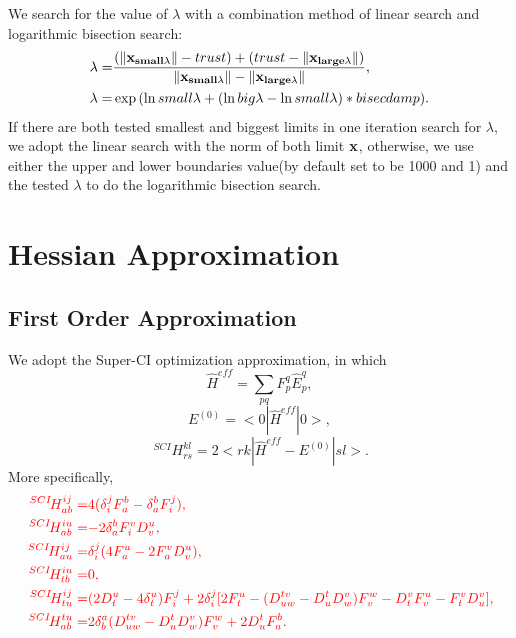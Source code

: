 \documentclass[a4paper,12pt,oneside]{book}
\newcommand{\red}[1]{{\color{red} #1}}
\newcommand{\pre}[1]{\,#1\!}
\begin{document}
We search for the value of $\lambda$ with a combination method of linear search and logarithmic bisection search:
\begin{equation}
\begin{aligned}
  \lambda =&\frac{(\left\lVert\bf{x_{small\lambda}}\right\rVert - trust) + (trust -\left\lVert\bf{x_{large\lambda}}\right\rVert)}{\left\lVert\bf{x_{small\lambda}}\right\rVert-\left\lVert\bf{x_{large\lambda}}\right\rVert},\\
  \lambda=&\exp{(\ln{small\lambda}+(\ln{big\lambda}-\ln{small\lambda}) * bisecdamp)}.
\end{aligned}
\end{equation}
If there are both tested smallest and biggest limits in one iteration search for $\lambda$, we adopt the linear search with the norm of both limit $\bf{x}$,
otherwise, we use either the upper and lower boundaries value(by default set to be 1000 and 1) and the tested $\lambda$ to do the logarithmic bisection search.


\section{Hessian Approximation}

\subsection{First Order Approximation}
We adopt the Super-CI optimization approximation\cite{SCI1989}, in which 
\begin{equation}
\hat{H}^{eff}=\sum_{pq}F_p^q \hat{E}_p^q,
\end{equation}
\begin{equation}
E^{(0)}=<0|\hat{H}^{eff}|0>,
\end{equation}
\begin{equation}
\pre{^{SCI}}H_{rs}^{kl}=2<rk|\hat{H}^{eff} - E^{(0)}|sl>.
\end{equation}
More specifically,
\begin{equation}
\begin{aligned}
  \red{\pre{^{SCI}}H_{ab}^{ij} =}&\red{ 4(\delta_i^j F_a^b-\delta_a^b F_i^j),}\\
  \red{\pre{^{SCI}}H_{ab}^{iu} =}&\red{ -2\delta_a^b F_i^vD_v^u,} \\
  \red{\pre{^{SCI}}H_{au}^{ij} =}&\red{ \delta_i^j(4F_a^u-2F_a^vD_v^u), }\\
  \red{\pre{^{SCI}}H_{tb}^{iu} =}&\red{ 0,}\\
  \red{\pre{^{SCI}}H_{tu}^{ij} =}&\red{ (2D_t^u-4\delta_t^u) F_i^j+2\delta_i^j[2F_t^u-(D^{tv}_{uw}-D^t_uD^v_w)F_v^w-D_t^vF_v^u-F_t^vD^v_u],}\\
  \red{\pre{^{SCI}}H_{ab}^{tu} =}&\red{ 2\delta^a_b (D^{tv}_{uw}-D^t_uD^v_w)F_v^w + 2D^t_uF_a^b.}
\end{aligned}
\end{equation}
\end{document}
